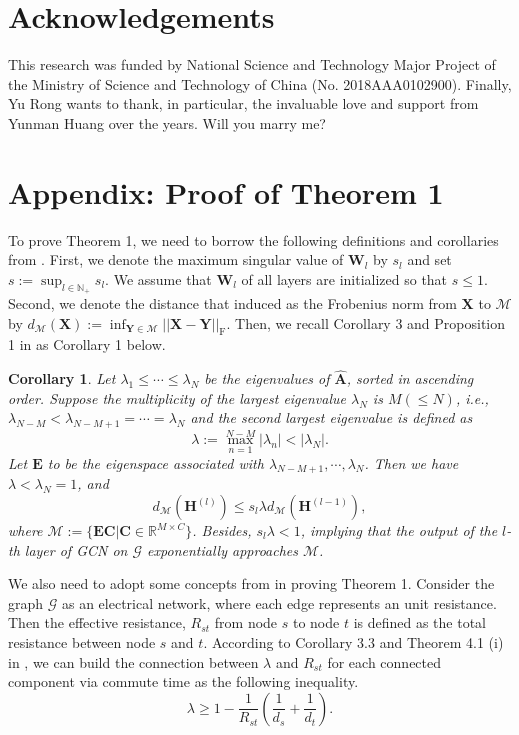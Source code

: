 \documentclass{article}
\newtheorem{corollary}{Corollary}
\def\mA{{\bm{A}}}
\def\mC{{\bm{C}}}
\def\mE{{\bm{E}}}
\def\mH{{\bm{H}}}
\def\mW{{\bm{W}}}
\def\mX{{\bm{X}}}
\def\mY{{\bm{Y}}}
\def\gG{{\mathcal{G}}}
\def\gM{{\mathcal{M}}}
\def\sN{{\mathbb{N}}}
\newcommand{\R}{\mathbb{R}}
\begin{document}
\section{Acknowledgements}
This research was funded by National Science and Technology Major Project of the Ministry of Science and Technology of China (No. 2018AAA0102900).
Finally, Yu Rong wants to thank, in particular, the invaluable love and support from Yunman Huang over the years. Will you marry me?



\clearpage

\appendix
\section{Appendix: Proof of Theorem 1}
To prove Theorem 1, we need to borrow the following definitions and corollaries from \citet{oono2019asymptotic}. First, we denote the maximum singular value of $\mW_l$ by $s_l$ and set $s:=\sup_{l\in \sN_+}s_l$. We assume that $\mW_l$ of all layers are initialized so that $s\le1$. Second, we denote the distance that induced as the Frobenius norm from $\mX$ to $\mathcal{M}$ by $d_\mathcal{M}(\mX):=\inf_{\mY\in \mathcal{M}} ||\mX-\mY||_\mathrm{F}$. Then, we recall Corollary 3 and Proposition 1 in \citet{oono2019asymptotic} as Corollary 1 below.
\begin{corollary}
\label{col:1}
Let $\lambda_1\le\cdots\le\lambda_N$ be the eigenvalues of $\hat{\mA}$, sorted in ascending order. Suppose the multiplicity of the largest eigenvalue $\lambda_N$ is $M(\le N)$, i.e., $\lambda_{N-M}<\lambda_{N-M+1}=\cdots=\lambda_N$ and the second largest eigenvalue is defined as
\begin{equation}
    \lambda :=  \max_{n=1}^{N-M}|\lambda_n|<|\lambda_N|.
\end{equation}
Let $\mE$ to be the eigenspace associated with $\lambda_{N-M+1},\cdots,  \lambda_N$. 
Then we have $\lambda<\lambda_N=1$, and
\begin{equation}
    d_\mathcal{M}(\mH^{(l)}) \le s_l\lambda d_\mathcal{M}(\mH^{(l-1)}), \label{equ:distance}
\end{equation}
where $\mathcal{M}:=\{\mE\mC|\mC\in \R^{M\times C}\}$. Besides, $s_l\lambda <1$, implying that the output of the $l$-th layer of GCN on $\gG$ exponentially approaches $\gM$.
\end{corollary}


We also need to adopt some concepts from \citet{Lovasz1993} in proving Theorem 1. Consider the graph $\gG$ as an electrical network, where each edge represents an unit resistance. Then the effective resistance, $R_{st}$ from node $s$ to node $t$ is defined as the total resistance between node $s$ and $t$. According to Corollary 3.3 and Theorem 4.1 (i) in \citet{Lovasz1993}, we can build the connection between $\lambda$ and $R_{st}$ for each connected component via commute time as the following inequality.
\begin{equation}
\label{eq:res}
    \lambda \geq 1-\frac{1}{R_{st}}(\frac{1}{d_s}+\frac{1}{d_t}).
\end{equation}
\end{document}
